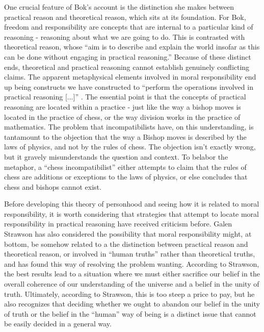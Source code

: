 \documentclass[phd,12pt,oneside,paper=letterpaper]{ubcthesis}
\begin{document}
One crucial feature of Bok's account is the distinction she makes between practical reason and theoretical reason, which sits at its foundation. For Bok, freedom and responsibility are concepts that are internal to a particular kind of reasoning - reasoning about what we are going to do. This is contrasted with theoretical reason, whose ``aim is to describe and explain the world insofar as this can be done without engaging in practical reasoning.'' \citep[p.63]{bok1998} Because of these distinct ends, theoretical and practical reasoning cannot establish genuinely conflicting claims. The apparent metaphysical elements involved in moral responsibility end up being constructs we have constructed to ``perform the operations involved in practical reasoning [...]'' \citep[p.72]{bok1998}. The essential point is that the concepts of practical reasoning are located within a practice - just like the way a bishop moves is located in the practice of chess, or the way division works in the practice of mathematics. The problem that incompatibilists have, on this understanding, is tantamount to the objection that the way a Bishop moves is described by the laws of physics, and not by the rules of chess. The objection isn't exactly wrong, but it gravely misunderstands the question and context. To belabor the metaphor, a ``chess incompatibilist'' either attempts to claim that the rules of chess are additions or exceptions to the laws of physics, or else concludes that chess and bishops cannot exist. 

Before developing this theory of personhood and seeing how it is related to moral responsibility, it is worth considering that strategies that attempt to locate moral responsibility in practical reasoning have received criticism before.  Galen Strawson \citeyearpar[p 276]{strawsong2010} has also considered the possibility that moral responsibility might, at bottom, be somehow related to a the distinction between practical reason and theoretical reason, or involved in ``human truths'' rather than theoretical truths, and has found this way of resolving the problem wanting. According to Strawson, the best results lead to a situation where we must either sacrifice our belief in the overall coherence of our understanding of the universe and a belief in the unity of truth. Ultimately, according to Strawson, this is too steep a price to pay, but he also recognizes that deciding whether we ought to abandon our belief in the unity of truth or the belief in the ``human'' way of being is a distinct issue that cannot be easily decided in a general way.
\end{document}

